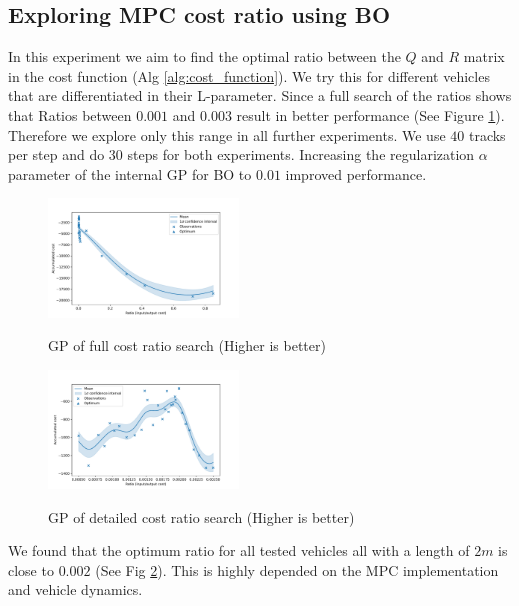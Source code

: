 \documentclass[twoside,twocolumn]{article}
\begin{document}
\subsection{Exploring MPC cost ratio using BO}

In this experiment we aim to find the optimal ratio between the $Q$ and $R$ matrix in the cost function (Alg \ref{alg:cost_function}). We try this for different vehicles that are differentiated in their L-parameter. Since a full search of the ratios shows that Ratios between $0.001$ and $0.003$ result in better performance (See Figure \ref{fig:cost_ratio_full}). Therefore we explore only this range in all further experiments. We use $40$ tracks per step and do $30$ steps for both experiments. Increasing the regularization $\alpha$ parameter of the internal GP for BO to $0.01$ improved performance.

\begin{figure}[h]
    \caption{GP of full cost ratio search (Higher is better)}
    \centering
    \includegraphics[width=0.45\textwidth]{fig_cost_ratio_full.pdf}
    \label{fig:cost_ratio_full}
\end{figure}

\begin{figure}[h]
    \caption{GP of detailed cost ratio search (Higher is better)}
    \centering
    \includegraphics[width=0.45\textwidth]{fig_cost_ratio_detail.pdf}
    \label{fig:cost_ratio_detail}
\end{figure}

We found that the optimum ratio for all tested vehicles all with a length of $2m$ is close to $0.002$ (See Fig \ref{fig:cost_ratio_detail}). This is highly depended on the MPC implementation and vehicle dynamics.
\end{document}
